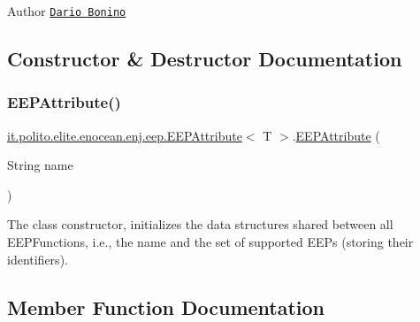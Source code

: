 \begin{DoxyAuthor}{Author}
\href{mailto:dario.bonino@gmail.com}{\tt Dario Bonino} 
\end{DoxyAuthor}


\subsection{Constructor \& Destructor Documentation}
\hypertarget{classit_1_1polito_1_1elite_1_1enocean_1_1enj_1_1eep_1_1_e_e_p_attribute_a489224c38bd4f7bb791fca3d8131bcd1}{}\label{classit_1_1polito_1_1elite_1_1enocean_1_1enj_1_1eep_1_1_e_e_p_attribute_a489224c38bd4f7bb791fca3d8131bcd1} 
\subsubsection{\texorpdfstring{E\+E\+P\+Attribute()}{EEPAttribute()}}
{\footnotesize\ttfamily \hyperlink{classit_1_1polito_1_1elite_1_1enocean_1_1enj_1_1eep_1_1_e_e_p_attribute}{it.\+polito.\+elite.\+enocean.\+enj.\+eep.\+E\+E\+P\+Attribute}$<$ T $>$.\hyperlink{classit_1_1polito_1_1elite_1_1enocean_1_1enj_1_1eep_1_1_e_e_p_attribute}{E\+E\+P\+Attribute} (\begin{DoxyParamCaption}\item[{String}]{name }\end{DoxyParamCaption})}

The class constructor, initializes the data structures shared between all E\+E\+P\+Functions, i.\+e., the name and the set of supported E\+E\+Ps (storing their identifiers). 

\subsection{Member Function Documentation}
\hypertarget{classit_1_1polito_1_1elite_1_1enocean_1_1enj_1_1eep_1_1_e_e_p_attribute_a4b90f971b342110a42ad49ac936bb1af}{}\label{classit_1_1polito_1_1elite_1_1enocean_1_1enj_1_1eep_1_1_e_e_p_attribute_a4b90f971b342110a42ad49ac936bb1af} 
